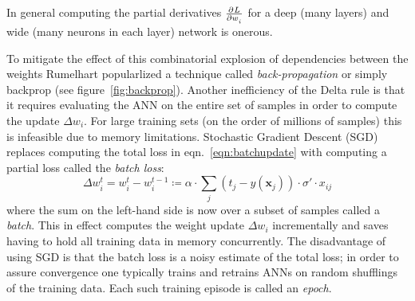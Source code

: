 In general computing the partial derivatives \(\pd{L}{w_i}\) for a deep (many layers) and wide (many neurons in each layer) network is onerous.
%

To mitigate the effect of this combinatorial explosion of dependencies between the weights Rumelhart \etal \cite{rumelhart1988learning} popularlized a technique called \textit{back-propagation} or simply backprop (see figure~\ref{fig:backprop}).
%
Another inefficiency of the Delta rule is that it requires evaluating the ANN on the entire set of samples in order to compute the update \(\Delta w_i\).
%
For large training sets (on the order of millions of samples) this is infeasible due to memory limitations.
%
Stochastic Gradient Descent (SGD) replaces computing the total loss in eqn.~\eqref{eqn:batchupdate} with computing a partial loss called the \textit{batch loss}:
\begin{equation}
    \Delta w_i^t = w_i^t - w_i^{t-1} \coloneqq \alpha \cdot \sum_j (t_j-y(\mathbf{x}_j))\cdot \sigma'\cdot x_{ij}
    \label{eqn:sgd}
\end{equation}
where the sum on the left-hand side is now over a subset of samples called a \textit{batch}.
%
This in effect computes the weight update \(\Delta w_i\) incrementally and saves having to hold all training data in memory concurrently.
%
The disadvantage of using SGD is that the batch loss is a noisy estimate of the total loss; in order to assure convergence one typically trains and retrains ANNs on random shufflings of the training data.
%
Each such training episode is called an \textit{epoch}.
%
